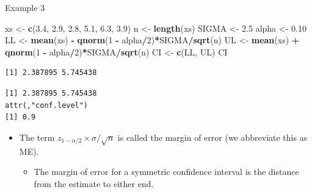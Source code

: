\documentclass[
  ignorenonframetext,
]{beamer}
\newenvironment{Shaded}{\begin{snugshade}}{\end{snugshade}}
\newcommand{\AttributeTok}[1]{\textcolor[rgb]{0.13,0.29,0.53}{#1}}
\newcommand{\CommentTok}[1]{\textcolor[rgb]{0.56,0.35,0.01}{\textit{#1}}}
\newcommand{\DecValTok}[1]{\textcolor[rgb]{0.00,0.00,0.81}{#1}}
\newcommand{\FloatTok}[1]{\textcolor[rgb]{0.00,0.00,0.81}{#1}}
\newcommand{\FunctionTok}[1]{\textcolor[rgb]{0.13,0.29,0.53}{\textbf{#1}}}
\newcommand{\NormalTok}[1]{#1}
\newcommand{\OtherTok}[1]{\textcolor[rgb]{0.56,0.35,0.01}{#1}}
\newcommand{\SpecialCharTok}[1]{\textcolor[rgb]{0.81,0.36,0.00}{\textbf{#1}}}
\providecommand{\tightlist}{%
  \setlength{\itemsep}{0pt}\setlength{\parskip}{0pt}}
\begin{document}
\begin{frame}[fragile]{Example 3}
\protect\hypertarget{example-3-1}{}
\tiny

\begin{Shaded}
\begin{Highlighting}[]
\NormalTok{xs }\OtherTok{\textless{}{-}} \FunctionTok{c}\NormalTok{(}\FloatTok{3.4}\NormalTok{, }\FloatTok{2.9}\NormalTok{, }\FloatTok{2.8}\NormalTok{, }\FloatTok{5.1}\NormalTok{, }\FloatTok{6.3}\NormalTok{, }\FloatTok{3.9}\NormalTok{)}
\NormalTok{n }\OtherTok{\textless{}{-}} \FunctionTok{length}\NormalTok{(xs)}
\NormalTok{SIGMA }\OtherTok{\textless{}{-}} \FloatTok{2.5}
\NormalTok{alpha }\OtherTok{\textless{}{-}} \FloatTok{0.10}
\NormalTok{LL }\OtherTok{\textless{}{-}} \FunctionTok{mean}\NormalTok{(xs) }\SpecialCharTok{{-}} \FunctionTok{qnorm}\NormalTok{(}\DecValTok{1} \SpecialCharTok{{-}}\NormalTok{ alpha}\SpecialCharTok{/}\DecValTok{2}\NormalTok{)}\SpecialCharTok{*}\NormalTok{SIGMA}\SpecialCharTok{/}\FunctionTok{sqrt}\NormalTok{(n)}
\NormalTok{UL }\OtherTok{\textless{}{-}} \FunctionTok{mean}\NormalTok{(xs) }\SpecialCharTok{+} \FunctionTok{qnorm}\NormalTok{(}\DecValTok{1} \SpecialCharTok{{-}}\NormalTok{ alpha}\SpecialCharTok{/}\DecValTok{2}\NormalTok{)}\SpecialCharTok{*}\NormalTok{SIGMA}\SpecialCharTok{/}\FunctionTok{sqrt}\NormalTok{(n)}
\NormalTok{CI }\OtherTok{\textless{}{-}} \FunctionTok{c}\NormalTok{(LL, UL)}
\NormalTok{CI}
\end{Highlighting}
\end{Shaded}

\begin{verbatim}
[1] 2.387895 5.745438
\end{verbatim}

\begin{Shaded}
\end{Shaded}

\begin{verbatim}
[1] 2.387895 5.745438
attr(,"conf.level")
[1] 0.9
\end{verbatim}

\normalsize

\begin{itemize}
\item
  The term \(z_{1-\alpha/2}\times \sigma/\sqrt{n}\) is called the margin
  of error (we abbreviate this as ME).

  \begin{itemize}
  \tightlist
  \item
    The margin of error for a symmetric confidence interval is the
    distance from the estimate to either end.
  \end{itemize}
\end{itemize}
\end{frame}
\end{document}
